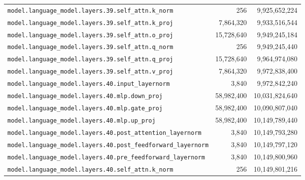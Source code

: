 \documentclass[10pt,a4paper]{article}
\theoremstyle{definition}
\begin{document}
\begin{appendices}
\begin{longtable}{p{9.5cm}rr}
\texttt{model.\allowbreak{}language\_model.\allowbreak{}layers.\allowbreak{}39.\allowbreak{}self\_attn.\allowbreak{}k\_norm} & 256 & 9,925,652,224 \\
\texttt{model.\allowbreak{}language\_model.\allowbreak{}layers.\allowbreak{}39.\allowbreak{}self\_attn.\allowbreak{}k\_proj} & 7,864,320 & 9,933,516,544 \\
\texttt{model.\allowbreak{}language\_model.\allowbreak{}layers.\allowbreak{}39.\allowbreak{}self\_attn.\allowbreak{}o\_proj} & 15,728,640 & 9,949,245,184 \\
\texttt{model.\allowbreak{}language\_model.\allowbreak{}layers.\allowbreak{}39.\allowbreak{}self\_attn.\allowbreak{}q\_norm} & 256 & 9,949,245,440 \\
\texttt{model.\allowbreak{}language\_model.\allowbreak{}layers.\allowbreak{}39.\allowbreak{}self\_attn.\allowbreak{}q\_proj} & 15,728,640 & 9,964,974,080 \\
\texttt{model.\allowbreak{}language\_model.\allowbreak{}layers.\allowbreak{}39.\allowbreak{}self\_attn.\allowbreak{}v\_proj} & 7,864,320 & 9,972,838,400 \\
\texttt{model.\allowbreak{}language\_model.\allowbreak{}layers.\allowbreak{}40.\allowbreak{}input\_layernorm} & 3,840 & 9,972,842,240 \\
\texttt{model.\allowbreak{}language\_model.\allowbreak{}layers.\allowbreak{}40.\allowbreak{}mlp.\allowbreak{}down\_proj} & 58,982,400 & 10,031,824,640 \\
\texttt{model.\allowbreak{}language\_model.\allowbreak{}layers.\allowbreak{}40.\allowbreak{}mlp.\allowbreak{}gate\_proj} & 58,982,400 & 10,090,807,040 \\
\texttt{model.\allowbreak{}language\_model.\allowbreak{}layers.\allowbreak{}40.\allowbreak{}mlp.\allowbreak{}up\_proj} & 58,982,400 & 10,149,789,440 \\
\texttt{model.\allowbreak{}language\_model.\allowbreak{}layers.\allowbreak{}40.\allowbreak{}post\_attention\_layernorm} & 3,840 & 10,149,793,280 \\
\texttt{model.\allowbreak{}language\_model.\allowbreak{}layers.\allowbreak{}40.\allowbreak{}post\_feedforward\_layernorm} & 3,840 & 10,149,797,120 \\
\texttt{model.\allowbreak{}language\_model.\allowbreak{}layers.\allowbreak{}40.\allowbreak{}pre\_feedforward\_layernorm} & 3,840 & 10,149,800,960 \\
\texttt{model.\allowbreak{}language\_model.\allowbreak{}layers.\allowbreak{}40.\allowbreak{}self\_attn.\allowbreak{}k\_norm} & 256 & 10,149,801,216 \\

\end{longtable}
\end{appendices}
\end{document}
